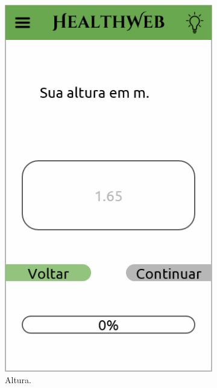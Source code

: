 \begin{figure}[htbp]
\begin{subfigure}{0.24\linewidth}
		\includegraphics[width=\linewidth]{figure/prototype/mobile/height.png}
		\caption{Altura.}
		\label{fig:mobile:height}
	\end{subfigure}
	\hfill
	\begin{subfigure}{0.24\linewidth}
		\centering

\end{subfigure}
\end{figure}
